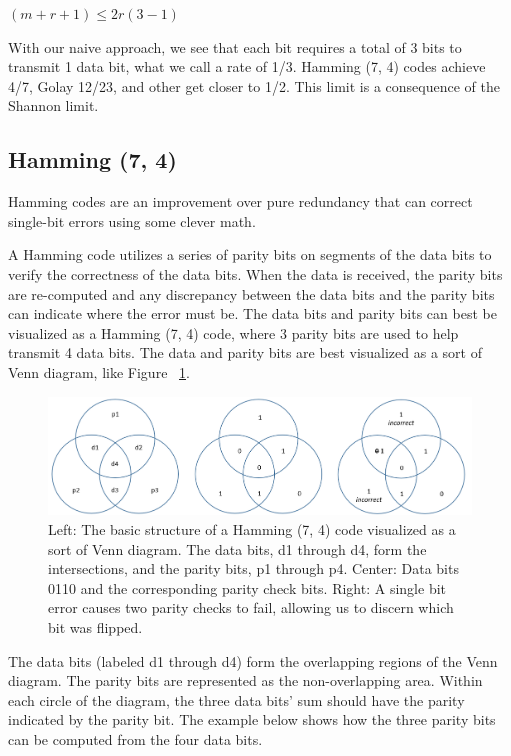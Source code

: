 \documentclass[12pt]{article}
\begin{document}
$(m + r + 1) ≤ 2 r (3-1)$ \cite{tanenbaum}

With our naive approach, we see that each bit requires a total of 3 bits to transmit 1 data bit, what we call a rate of 1/3. Hamming (7, 4) codes achieve 4/7, Golay 12/23, and other get closer to 1/2. This limit is a consequence of the Shannon limit. \cite{pless}

\subsection{Hamming (7, 4)}

Hamming codes are an improvement over pure redundancy that can correct single-bit errors using some clever math. 

A Hamming code utilizes a series of parity bits on segments of the data bits to verify the correctness of the data bits. When the data is received, the parity bits are re-computed and any discrepancy between the data bits and the parity bits can indicate where the error must be. The data bits and parity bits can best be visualized as a Hamming (7, 4) code, where 3 parity bits are used to help transmit 4 data bits. The data and parity bits are best visualized as a sort of Venn diagram, like Figure ~\ref{fig:hamming}.

\begin{figure}[h!]
 \centering
 \includegraphics[width=\textwidth]{img/Hamming.png}
 \caption{Left: The basic structure of a Hamming (7, 4) code visualized as a sort of Venn diagram. The data bits, d1 through d4, form the intersections, and the parity bits, p1 through p4. Center: Data bits 0110 and the corresponding parity check bits. Right: A single bit error causes two parity checks to fail, allowing us to discern which bit was flipped.}
 \label{fig:hamming}
 \end{figure}

The data bits (labeled d1 through d4) form the overlapping regions of the Venn diagram. The parity bits are represented as the non-overlapping area. Within each circle of the diagram, the three data bits' sum should have the parity indicated by the parity bit. The example below shows how the three parity bits can be computed from the four data bits.
\end{document}
